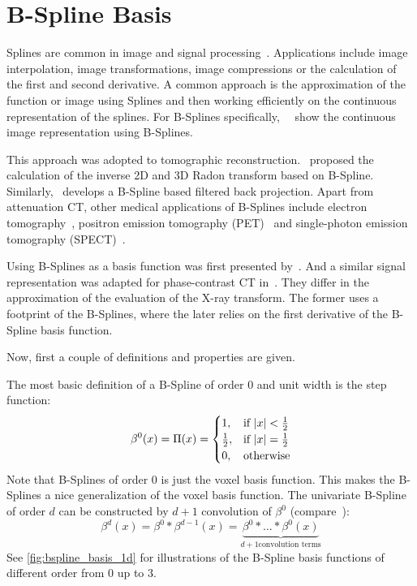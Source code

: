 \section{B-Spline Basis}\label{sec:bspline_basis}

Splines are common in image and signal processing~\cite{unser_splines_1999}. Applications include
image interpolation, image transformations, image compressions or the calculation of the first and
second derivative. A common approach is the approximation of the function or image using Splines and
then working efficiently on the continuous representation of the splines. For B-Splines
specifically,~\citeauthor*{unser_fast_1991}~\cite{unser_fast_1991} show the continuous image
representation using B-Splines.

This approach was adopted to tomographic reconstruction.~\cite{la_riviere_spline-based_1998}
proposed the calculation of the inverse 2D and 3D Radon transform based on B-Spline.
Similarly,~\cite{horbelt_discretization_2002} develops a B-Spline based filtered back projection.
Apart from attenuation CT, other medical applications of B-Splines include electron
tomography~\cite{tran_robust_2013, tran_inverse_2014}, positron emission tomography
(PET)~\cite{nichols_spatiotemporal_2002, li_fast_2007, verhaeghe_investigation_2007} and
single-photon emission tomography (SPECT)~\cite{guedon_b-spline_1991, reutter_fully_2007}.

Using B-Splines as a basis function was first presented by~\cite{momey_new_2011,
	momey_b-spline_2012, momey_spline_2015}. And a similar signal representation was adapted for
phase-contrast CT in~\cite{nilchian_fast_2013, nilchian_differential_2012, nilchian_spline_2015}.
They differ in the approximation of the evaluation of the X-ray transform. The former uses a
footprint of the B-Splines, where the later relies on the first derivative of the B-Spline basis
function.

Now, first a couple of definitions and properties are given.
\begin{definition}[B-Spline]
	The most basic definition of a B-Spline of order \(0\) and unit width is the step function:
	\[
		\beta^0(x) = \Pi(x) =
		\begin{cases}
			1,           & \text{if } \lvert x\rvert < \frac{1}{2} \\
			\frac{1}{2}, & \text{if } \lvert x\rvert = \frac{1}{2} \\
			0,           & \text{otherwise}
		\end{cases}
	\]
	Note that B-Splines of order \(0\) is just the voxel basis function. This makes the
	B-Splines a nice generalization of the voxel basis function. The univariate B-Spline of
	order \(d\) can be constructed by \(d + 1\) convolution of
	\(\beta^0\) (compare~\cite{momey_new_2011}):
	\[
		\beta^d(x) = \beta^0 * \beta^{d-1}(x) = \underbrace{\beta^0 * \dots * \beta^0(x)}_{d+1 \text{convolution terms}}
	\]
	See \autoref{fig:bspline_basis_1d} for illustrations of the B-Spline basis functions of
	different order from \(0\) up to \(3\).
\end{definition}

